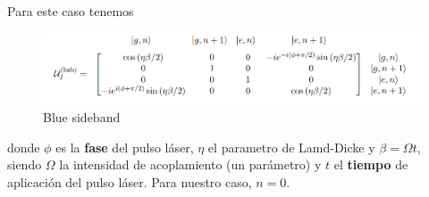 		
Para este caso tenemos 
\begin{figure}[H]
    \centering 
    \includegraphics[width=1\linewidth]{Figuras/Fig_ions_U_bsb.png}
    \caption{Blue sideband}
    \label{Fig_ions_U_bsb}
\end{figure}
donde $\phi$ es la \textbf{fase} del pulso láser, $\eta$ el parametro de Lamd-Dicke y $\beta = \Omega t$, siendo $\Omega$ la intensidad de acoplamiento (un parámetro) y $t$ el \textbf{tiempo} de aplicación del pulso láser. Para nuestro caso, $n = 0$.

